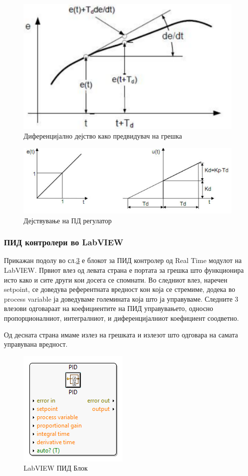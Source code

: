 \documentclass{article}
\begin{document}
\begin{figure}[H]
\includegraphics[width=0.3\linewidth]{./images/el_8.png}
\centering
\caption{Диференцијално дејство како предвидувач на грешка}
\label{fig:el_8.png}
\end{figure}

\begin{figure}[H]
\includegraphics[width=0.3\linewidth]{./images/el_9.png}
\centering
\caption{Дејствување на ПД регулатор}
\label{fig:el_9.png}
\end{figure}



\subsubsection{ПИД контролери во LabVIEW}

Прикажан подолу во сл.\ref{fig:PIDBlock.png} е блокот за ПИД контролер од Real Time модулот на LabVIEW. Првиот влез од левата страна е портата за грешка што функционира исто како и сите други кои досега се спомнати. Во следниот влез, наречен setpoint, се доведува референтната вредност кон која се стремиме, додека во process variable ја доведуваме големината која што ја управуваме. Следните 3 влезови одговараат на коефициентите на ПИД управувањето, односно пропорционалниот, интегралниот, и диференцијалниот коефициент соодветно.

Од десната страна имаме излез на грешката и излезот што одговара на самата управувана вредност.

\begin{figure}[H]
\includegraphics[width=0.3\linewidth]{./images/PIDBlock.png}
\centering
\caption{LabVIEW ПИД Блок}
\label{fig:PIDBlock.png}
\end{figure}
\end{document}
